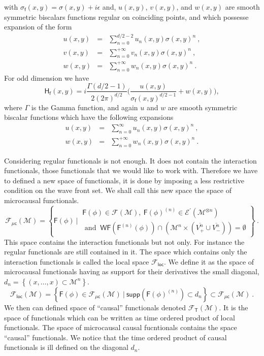 \documentclass[10pt]{book}
\newcommand{\supp}{\mathsf{supp}}
\newcommand{\WF}{\mathsf{WF}}
\newcommand{\Ecal}{\mathcal{E}}
\newcommand{\Fcal}{\mathcal{F}}
\newcommand{\Mcal}{\mathcal{M}}
\newcommand{\Fsf}{\mathsf{F}}
\newcommand{\Hsf}{\mathsf{H}}
\newcommand{\Tsf}{\mathsf{T}}
\newcommand{\csf}{\mathsf{c}}
\newcommand{\fsf}{\mathsf{f}}
\theoremstyle{break}
\begin{document}
%
with $\sigma_\fsf(x,y) = \sigma(x,y) + i \epsilon$ and, $u(x,y)$, $v(x,y)$, and $w(x,y)$ are smooth symmetric biscalars functions regular on coinciding points, and which possesse expansion of the form
%
\begin{eqnarray*}
u(x,y) &=& \sum_{n=0}^{d/2-2} u_n(x,y) \sigma(x,y)^n \ , \\
v(x,y) &=& \sum_{n=0}^{+\infty} v_n(x,y) \sigma(x,y)^n \ , \\
w(x,y) &=& \sum_{n=0}^{+\infty} w_n(x,y) \sigma(x,y)^n \ .
\end{eqnarray*}
% 
For odd dimension we have
%
\begin{equation*}
\Hsf_\fsf(x,y) = i \frac{\Gamma(d/2-1)}{2(2\pi)^{d/2}} \bigg( \frac{u(x,y)}{\sigma_\fsf(x,y)^{d/2-1}} + w(x,y) \bigg) ,
\end{equation*}
%
where $\Gamma$ is the Gamma function, and again $u$ and $w$ are smooth symmetric biscalar functions which have the following expansions
%
\begin{eqnarray*}
u(x,y) &=& \sum_{n=0}^{\infty} u_n(x,y) \sigma(x,y)^n \ , \\
w(x,y) &=& \sum_{n=0}^{+\infty} w_n(x,y) \sigma(x,y)^n \ . 
\end{eqnarray*}

\bigskip

Considering regular functionals is not enough. It does not contain the interaction functionals, those functionals that we would like to work with. Therefore we have to defined a new space of functionals, it is done by imposing a less restrictive condition on the wave front set. We shall call this new space the space of microcausal functionals.
%
\begin{equation*}
\Fcal_{\mu\csf}(\Mcal) = \left\{ 
\Fsf(\phi) \ \bigg| \ 
\begin{array}{l}
\Fsf(\phi) \in \Fcal(\Mcal), \ \Fsf(\phi)^{(n)} \in \Ecal^\prime(\Mcal^{\otimes n}) \\
\mbox{ and } \ \WF(\Fsf^{(n)}(\phi)) \cap \left( \Mcal^n \times ( \overline{V^{n}_{+}} \cup \overline{V^{n}_{-}} ) \right)  = \emptyset 
\end{array}
\right\} \ .
\end{equation*}
%
This space contains the interaction functionals but not only. For instance the regular functionals are still contained in it. The space which contains only the interaction functionals is called the local space $\mathcal{F}_\mathsf{loc}$. We define it as the space of microcausal functionals having as support for their derivatives the small diagonal, $d_n = \left\{ (x,\dots,x) \subset \Mcal^n \right\}$.
%
\begin{equation*}
\Fcal_{\mathsf{loc}}(\Mcal) = \left\{ \Fsf(\phi) \in \Fcal_{\mu\csf}(\Mcal) \ \bigg| \ \supp\left(\Fsf(\phi)^{(n)}\right) \subset d_n \right\} \subset \Fcal_{\mu\csf}(\Mcal) \ .
\end{equation*}
%
We then can defined space of ``causal'' functionals denoted $\Fcal_\Tsf(\Mcal)$. It is the space of functionals which can be written as time ordered product of local functionals. The space of microcausal causal fucntionals contains the space ``causal'' functionals. We notice that the time ordered product of causal functionals is ill defined on the diagonal $d_n$.
\end{document}
